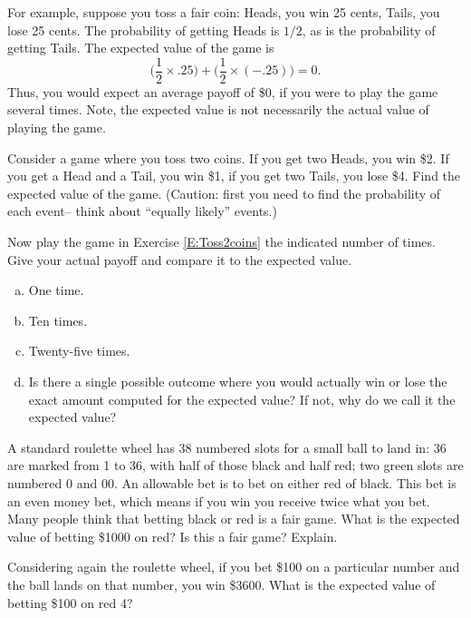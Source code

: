 For example, suppose you toss a fair coin: Heads, you win 25 cents, Tails, you lose 25 cents. The probability of getting Heads is $1/2$, as is the probability of getting Tails. The expected value of the game is
\[\biggl(\frac{1}{2}\times .25\biggr)+\biggl(\frac{1}{2}\times(- .25)\biggr)=0.\]
Thus, you would expect an average payoff of \$0, if you were to play the game several times. Note, the expected value is not necessarily the actual value of playing the game.



\begin{xca}\label{E:Toss2coins}
Consider a game where you toss two coins. If you get two Heads, you win \$2. If you get a Head and a Tail, you win \$1, if you get two Tails, you lose \$4. Find the expected value of the game. (Caution: first you need to find the probability of each event-- think about ``equally likely'' events.)
\end{xca}


\begin{xca}
Now play the game in Exercise \ref{E:Toss2coins} the indicated number of times. Give your actual payoff and compare it to the expected value.
\begin{enumerate}[(a)]
\item One time.
\item Ten times.
\item Twenty-five times.
\item Is there a single possible outcome where you would actually win or lose the exact amount computed for the expected value? If not, why do we call it the expected value?
\end{enumerate}
\end{xca}

\begin{xca}
A standard roulette wheel has 38 numbered slots for a small ball to land in: 36 are marked from 1 to 36, with half of those black and half red; two green slots are numbered 0 and 00. An allowable bet is to bet on either red of black. This bet is an even money bet, which means if you win you receive twice what you bet. Many people think that betting black or red is a fair game. What is the expected value of betting \$1000 on red? Is this a fair game? Explain.
\end{xca}

\begin{xca}
Considering again the roulette wheel, if you bet \$100 on a particular number and the ball lands on that number, you win \$3600. What is the expected value of betting \$100 on red 4?
\end{xca}

